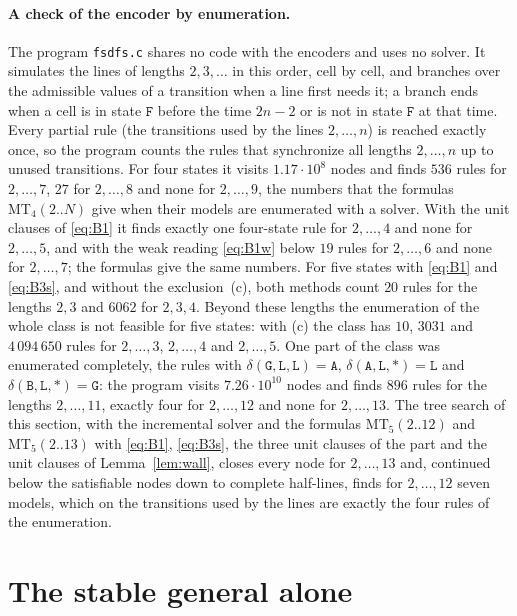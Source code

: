 \documentclass[11pt]{article}
\theoremstyle{remark}
\newcommand{\Lq}{\mathtt{L}}\newcommand{\Gq}{\mathtt{G}}\newcommand{\Aq}{\mathtt{A}}\newcommand{\Bq}{\mathtt{B}}\newcommand{\Fq}{\mathtt{F}}
\newcommand{\MT}{\mathrm{MT}}
\begin{document}
\paragraph{A check of the encoder by enumeration.} The program \texttt{fsdfs.c} shares no code with the
encoders and uses no solver. It simulates the lines of lengths $2,3,\dots$ in this order, cell by cell, and
branches over the admissible values of a transition when a line first needs it; a branch ends when a cell is in
state $\Fq$ before the time $2n-2$ or is not in state $\Fq$ at that time. Every partial rule (the transitions
used by the lines $2,\dots,n$) is reached exactly once, so the program counts the rules that synchronize all
lengths $2,\dots,n$ up to unused transitions. For four states it visits $1.17\cdot10^8$ nodes and finds
$536$ rules for $2,\dots,7$, $27$ for $2,\dots,8$ and none for $2,\dots,9$, the numbers that the formulas
$\MT_4(2..N)$ give when their models are enumerated with a solver. With the unit clauses of \eqref{eq:B1} it finds
exactly one four-state rule for $2,\dots,4$ and none for $2,\dots,5$, and with the weak reading \eqref{eq:B1w}
below $19$ rules for $2,\dots,6$ and none for $2,\dots,7$; the formulas give the same numbers. For five states
with \eqref{eq:B1} and \eqref{eq:B3s}, and without the exclusion~(c), both methods count $20$ rules for the lengths $2,3$ and $6062$
for $2,3,4$. Beyond these lengths the enumeration of the whole class is not feasible for five states: with
(c) the class has $10$, $3031$ and $4\,094\,650$ rules for $2,\dots,3$, $2,\dots,4$ and $2,\dots,5$. One part
of the class was enumerated completely, the rules with $\delta(\Gq,\Lq,\Lq)=\Aq$,
$\delta(\Aq,\Lq,\ast)=\Lq$ and $\delta(\Bq,\Lq,\ast)=\Gq$: the program visits $7.26\cdot10^{10}$ nodes and
finds $896$ rules for the lengths $2,\dots,11$, exactly four for $2,\dots,12$ and none for $2,\dots,13$. The
tree search of this section, with the incremental solver and the formulas $\MT_5(2..12)$ and $\MT_5(2..13)$
with \eqref{eq:B1}, \eqref{eq:B3s}, the three unit clauses of the part and the unit clauses of
Lemma~\ref{lem:wall}, closes every node for $2,\dots,13$ and, continued below the satisfiable nodes down to
complete half-lines, finds for $2,\dots,12$ seven models, which on the transitions used by the lines are
exactly the four rules of the enumeration.

\section{The stable general alone}\label{sec:search}
\end{document}
